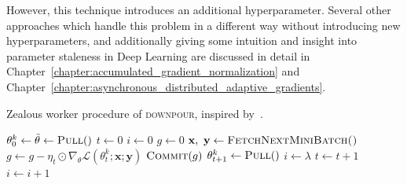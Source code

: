 However, this technique introduces an additional hyperparameter. Several other approaches which handle this problem in a different way without introducing new hyperparameters, and additionally giving some intuition and insight into parameter staleness in Deep Learning are discussed in detail in Chapter~\ref{chapter:accumulated_gradient_normalization} and Chapter~\ref{chapter:asynchronous_distributed_adaptive_gradients}.

\begin{algorithm}[H]
  \caption{Zealous worker procedure of \textsc{downpour}, inspired by~\cite{louppe2010zealous}.}
  \label{algo:downpour_worker_zealous}
  \begin{algorithmic}[1]
    \State $\theta^k_0 \gets \tilde{\theta} \gets \Call{Pull}$
    \State $t \gets 0$
    \State $i \gets 0$
    \State $g \gets 0$
    \State $\textbf{x},~\textbf{y} \gets \Call{FetchNextMiniBatch()}{}$
    \State $g \gets g -\eta_t \odot \nabla_\theta \mathcal{L}(\theta^k_t;\textbf{x};\textbf{y})$
    \State $\Call{Commit}{g}$
    \State $\theta^k_{t + 1} \gets \Call{Pull}$
    \State $i \gets \lambda$ 
    \EndIf
    \State $t \gets t + 1$
    \State $i \gets i + 1$
    \EndWhile
    \EndWhile
    \EndProcedure
  \end{algorithmic}
\end{algorithm}

